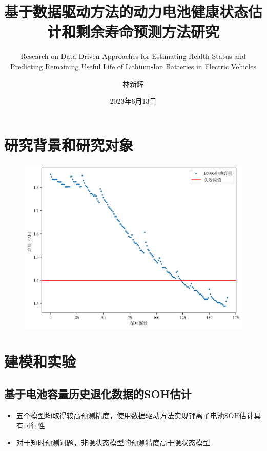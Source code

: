 \documentclass{beamer}
\author{林新辉}
\title{基于数据驱动方法的动力电池健康状态估计和剩余寿命预测方法研究}
\subtitle{Research on Data-Driven Approaches for Estimating Health Status and Predicting Remaining Useful Life of Lithium-Ion Batteries in Electric Vehicles}
\institute{控制与计算机工程学院，华北电力大学}
\date{2023年6月13日}
\begin{document}
\kaishu
\begin{frame}
\titlepage
\end{frame}

\begin{frame}
\tableofcontents[sectionstyle=show,subsectionstyle=show/shaded/hide,subsubsectionstyle=show/shaded/hide]
\end{frame}

\section{研究背景和研究对象}

\begin{frame}
	\begin{figure}[htbp]
		\includegraphics[scale=0.5]{figures/nasa_B0005_failure_threshold.jpg}
	\end{figure}
\end{frame}

\section{建模和实验}

\subsection{基于电池容量历史退化数据的SOH估计}

\begin{frame}
	\begin{itemize}
		\item 五个模型均取得较高预测精度，使用数据驱动方法实现锂离子电池SOH估计具有可行性
		\item 对于短时预测问题，非隐状态模型的预测精度高于隐状态模型
	\end{itemize}
\end{frame}
\end{document}

